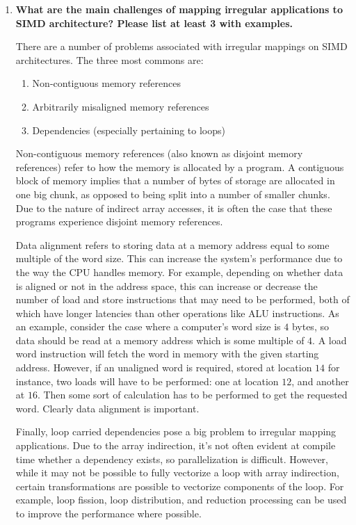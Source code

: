 \documentclass[10pt]{article} %
\begin{document}
\begin{enumerate}
\item %
\textbf{What are the main challenges of mapping irregular applications to SIMD architecture?  Please list at least 3 with examples.  }

There are a number of problems associated with irregular mappings on SIMD architectures.  The three most commons are:

\begin{enumerate}[1)]
\item Non-contiguous memory references
\item Arbitrarily misaligned memory references
\item Dependencies (especially pertaining to loops)
\end{enumerate}

Non-contiguous memory references (also known as disjoint memory references) refer to how the memory is allocated by a program.  A contiguous block of memory implies that a number of bytes of storage are allocated in one big chunk, as opposed to being split into a number of smaller chunks.  Due to the nature of indirect array accesses, it is often the case that these programs experience disjoint memory references.  

Data alignment refers to storing data at a memory address equal to some multiple of the word size.  This can increase the system's performance due to the way the CPU handles memory.  For example, depending on whether data is aligned or not in the address space, this can increase or decrease the number of load and store instructions that may need to be performed, both of which have longer latencies than other operations like ALU instructions.  As an example, consider the case where a computer's word size is $4$ bytes, so data should be read at a memory address which is some multiple of $4$.  A load word instruction will fetch the word in memory with the given starting address.  However, if an unaligned word is required, stored at location $14$ for instance, two loads will have to be performed: one at location $12$, and another at $16$.  Then some sort of calculation has to be performed to get the requested word.  Clearly data alignment is important.  

Finally, loop carried dependencies pose a big problem to irregular mapping applications.  Due to the array indirection, it's not often evident at compile time whether a dependency exists, so parallelization is difficult.  However, while it may not be possible to fully vectorize a loop with array indirection, certain transformations are possible to vectorize components of the loop.  For example, loop fission, loop distribution, and reduction processing can be used to improve the performance where possible.  

\end{enumerate}
\end{document}
